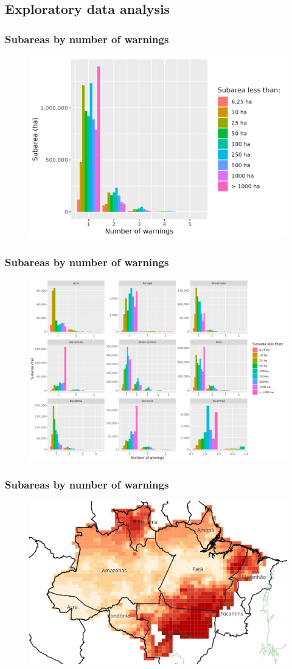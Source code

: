 \documentclass[aspectratio=169]{beamer}
\begin{document}
\subsection{Exploratory data analysis}

\begin{frame}
    \frametitle{Subareas by number of warnings}
    \begin{figure}[h]
        \includegraphics[width=0.70\linewidth]
        {./figures/plot_deter_subarea_by_nwarnings.png}
    \end{figure}
\end{frame}

\begin{frame}
    \frametitle{Subareas by number of warnings}
    \begin{figure}[h]
        \includegraphics[width=0.70\linewidth]
        {./figures/plot_deter_subarea_by_warnings_state.png}
    \end{figure}
\end{frame}

\begin{frame}
    \frametitle{Subareas by number of warnings}
    \begin{figure}[h]
        \includegraphics[width=0.70\linewidth]
        {./images/nwarnings_idw_map.png}
    \end{figure}
\end{frame}
\end{document}

